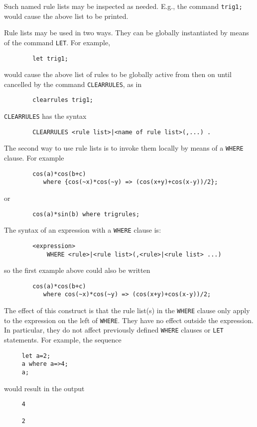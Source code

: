 Such named rule lists may be inspected as needed. E.g., the command
{\tt trig1;} would cause the above list to be printed.

Rule lists may be used in two ways.  They can be globally instantiated by
means of the command {\tt LET}. For example,
\begin{verbatim}
        let trig1;
\end{verbatim}
would cause the above list of rules to be globally active from then on until
cancelled by the command {\tt CLEARRULES}, as in
\begin{verbatim}
        clearrules trig1;
\end{verbatim}
{\tt CLEARRULES} has the syntax
\begin{verbatim}
        CLEARRULES <rule list>|<name of rule list>(,...) .
\end{verbatim}

The second way to use rule lists is to invoke them locally by means of a
{\tt WHERE} clause.  For example
\begin{verbatim}
        cos(a)*cos(b+c)
           where {cos(~x)*cos(~y) => (cos(x+y)+cos(x-y))/2};
\end{verbatim}
or
\begin{verbatim}
        cos(a)*sin(b) where trigrules;
\end{verbatim}

The syntax of an expression with a {\tt WHERE} clause is:
\begin{verbatim}
        <expression>
            WHERE <rule>|<rule list>(,<rule>|<rule list> ...)
\end{verbatim}
so the first example above could also be written
\begin{verbatim}
        cos(a)*cos(b+c)
           where cos(~x)*cos(~y) => (cos(x+y)+cos(x-y))/2;
\end{verbatim}

The effect of this construct is that the rule list(s) in the {\tt WHERE}
clause only apply to the expression on the left of {\tt WHERE}.  They have
no effect outside the expression.  In particular, they do not affect
previously defined {\tt WHERE} clauses or {\tt LET} statements.  For
example, the sequence
\begin{verbatim}
     let a=2;
     a where a=>4;
     a;
\end{verbatim}
would result in the output
\begin{verbatim}
     4

     2
\end{verbatim}

